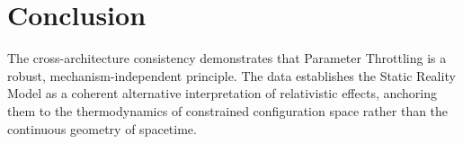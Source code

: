 \documentclass[twocolumn,prd,amsmath,amssymb,superscriptaddress]{revtex4-2}
\begin{document}
\section{Conclusion}
The cross-architecture consistency demonstrates that Parameter Throttling is a robust, mechanism-independent principle. The data establishes the Static Reality Model as a coherent alternative interpretation of relativistic effects, anchoring them to the thermodynamics of constrained configuration space rather than the continuous geometry of spacetime.
\end{document}
